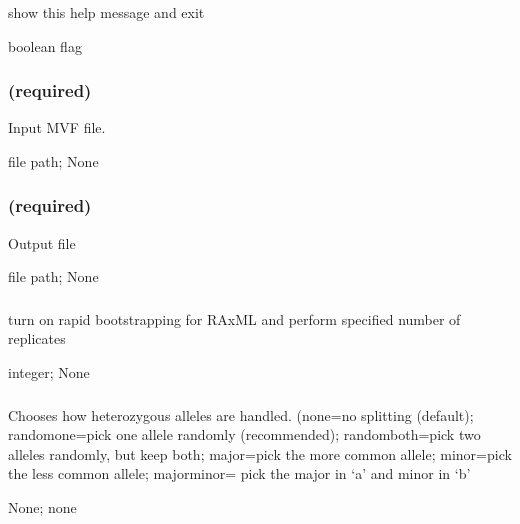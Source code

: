 \documentclass[letterpaper,11pt,english]{sphinxmanual}
\begin{document}
\subsubsection{}
\label{\detokenize{prog_desc:id118}}
 show this help message and exit

 boolean flag


\subsubsection{ (required)}
\label{\detokenize{prog_desc:id119}}
 Input MVF file.

 file path;  None


\subsubsection{ (required)}
\label{\detokenize{prog_desc:id120}}
 Output file

 file path;  None


\subsubsection{}
\label{\detokenize{prog_desc:bootstrap}}
 turn on rapid bootstrapping for RAxML and perform specified number of replicates

 integer;  None


\subsubsection{}
\label{\detokenize{prog_desc:choose-allele-chooseallele-hapmode}}
 Chooses how heterozygous alleles are handled. (none=no splitting (default); randomone=pick one allele randomly (recommended); randomboth=pick two alleles randomly, but keep both; major=pick the more common allele; minor=pick the less common allele; majorminor= pick the major in ‘a’ and minor in ‘b’

 None;  none
\end{document}
